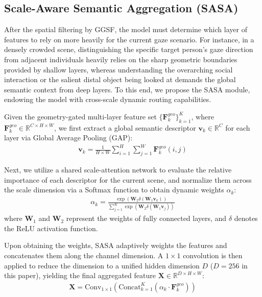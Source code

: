 \documentclass[sigconf,review,anonymous,screen]{acmart}
\begin{document}
\subsection{Scale-Aware Semantic Aggregation (SASA)}

After the spatial filtering by GGSF, the model must determine which layer of features to rely on more heavily for the current gaze scenario. For instance, in a densely crowded scene, distinguishing the specific target person's gaze direction from adjacent individuals heavily relies on the sharp geometric boundaries provided by shallow layers, whereas understanding the overarching social interaction or the salient distal object being looked at demands the global semantic context from deep layers. To this end, we propose the SASA module, endowing the model with cross-scale dynamic routing capabilities.

Given the geometry-gated multi-layer feature set $\{\mathbf{F}_k^{geo}\}_{k=1}^K$, where $\mathbf{F}_k^{geo} \in \mathbb{R}^{C \times H \times W}$, we first extract a global semantic descriptor $\mathbf{v}_k \in \mathbb{R}^C$ for each layer via Global Average Pooling (GAP):
\begin{equation}
\label{eq:gap}
    \begin{aligned}
    \mathbf{v}_k = \frac{1}{H \times W} \sum_{i=1}^H \sum_{j=1}^W \mathbf{F}_k^{geo}(i, j)
    \end{aligned}
\end{equation}

Next, we utilize a shared scale-attention network to evaluate the relative importance of each descriptor for the current scene, and normalize them across the scale dimension via a Softmax function to obtain dynamic weights $\alpha_k$:
\begin{equation}
\label{eq:dynamic_weights}
    \begin{aligned}
    \alpha_k = \frac{\exp(\mathbf{W}_2 \delta(\mathbf{W}_1 \mathbf{v}_k))}{\sum_{j=1}^K \exp(\mathbf{W}_2 \delta(\mathbf{W}_1 \mathbf{v}_j))}
    \end{aligned}
\end{equation}
where $\mathbf{W}_1$ and $\mathbf{W}_2$ represent the weights of fully connected layers, and $\delta$ denotes the ReLU activation function.

Upon obtaining the weights, SASA adaptively weights the features and concatenates them along the channel dimension. A $1 \times 1$ convolution is then applied to reduce the dimension to a unified hidden dimension $D$ ($D=256$ in this paper), yielding the final aggregated feature $\mathbf{X} \in \mathbb{R}^{D \times H \times W}$:
\begin{equation}
\label{eq:aggregated_feature}
    \begin{aligned}
    \mathbf{X} = \text{Conv}_{1 \times 1}\left( \text{Concat}_{k=1}^K (\alpha_k \cdot \mathbf{F}_k^{geo}) \right)
    \end{aligned}
\end{equation}
\end{document}
